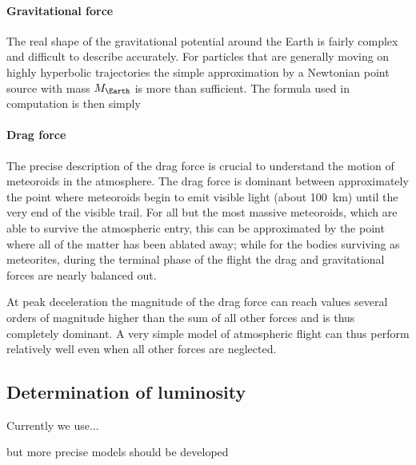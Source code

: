             \paragraph{Gravitational force} \label{saig}
                The real shape of the gravitational potential around the Earth is fairly complex and difficult to describe accurately.
                For particles that are generally moving on highly hyperbolic trajectories the
                simple approximation by a Newtonian point source with mass $M_\Earth$ is more than sufficient.
                The formula used in computation is then simply

            \paragraph{Drag force} \label{said}
                The precise description of the drag force is crucial to understand the motion
                of meteoroids in the atmosphere. The drag force is dominant between approximately
                the point where meteoroids begin to emit visible light (about \SI{100}{\kilo\metre})
                until the very end of the visible trail. For all but the most massive meteoroids,
                which are able to survive the atmospheric entry, this can be approximated
                by the point where all of the matter has been ablated away; while for the bodies
                surviving as meteorites, during the terminal phase of the flight the drag and
                gravitational forces are nearly balanced out.

                At peak deceleration the magnitude of the drag force can reach values several orders of magnitude
                higher than the sum of all other forces and is thus completely dominant.
                A very simple model of atmospheric flight can thus perform relatively
                well even when all other forces are neglected.

    

    \subsection{Determination of luminosity} \label{sail}
        Currently we use... \citep{hill+2005} 

        \citep{bronshten1983}
        but more precise models should be developed
        

